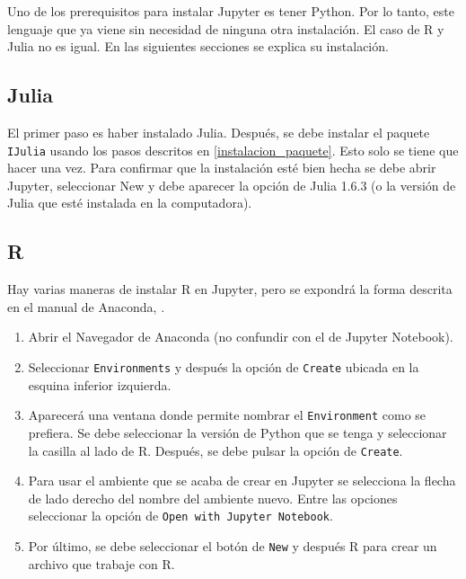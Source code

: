 Uno de los prerequisitos para instalar Jupyter es tener \textsf{Python}. Por lo tanto, este lenguaje que ya viene sin necesidad de ninguna otra instalación. El caso de \textsf{R} y \textsf{Julia} no es igual. En las siguientes secciones se explica su instalación.

\subsection{Julia}

El primer paso es haber instalado \textsf{Julia}. Después, se debe instalar el paquete \texttt{IJulia} usando los pasos descritos en \ref{instalacion_paquete}. Esto solo se tiene que hacer una vez. Para confirmar que la instalación esté bien hecha se debe abrir \textsf{Jupyter}, seleccionar \textsf{New} y debe aparecer la opción de \textsf{Julia 1.6.3} (o la versión de \textsf{Julia} que esté instalada en la computadora). 

\subsection{R}

Hay varias maneras de instalar \textsf{R} en \textsf{Jupyter}, pero se expondrá la forma descrita en el manual de \textsf{Anaconda}, \cite{anaconda_doc}. 

\begin{enumerate}
	\item Abrir el Navegador de \textsf{Anaconda} (no confundir con el de \textsf{Jupyter Notebook}).
	
	\item Seleccionar \texttt{Environments} y después la opción de \texttt{Create} ubicada en la esquina inferior izquierda. 
	
	\item Aparecerá una ventana donde permite nombrar el \texttt{Environment} como se prefiera. Se debe seleccionar la versión de \textsf{Python} que se tenga y seleccionar la casilla al lado de \textsf{R}. Después, se debe pulsar la opción de \texttt{Create}. 
	
	\item Para usar el ambiente que se acaba de crear en \textsf{Jupyter} se selecciona la flecha de lado derecho del nombre del ambiente nuevo. Entre las opciones seleccionar la opción de \texttt{Open with Jupyter Notebook}. 
	
	\item Por último, se debe seleccionar el botón de \texttt{New} y después \textsf{R} para crear un archivo que trabaje con \textsf{R}. 
\end{enumerate}

